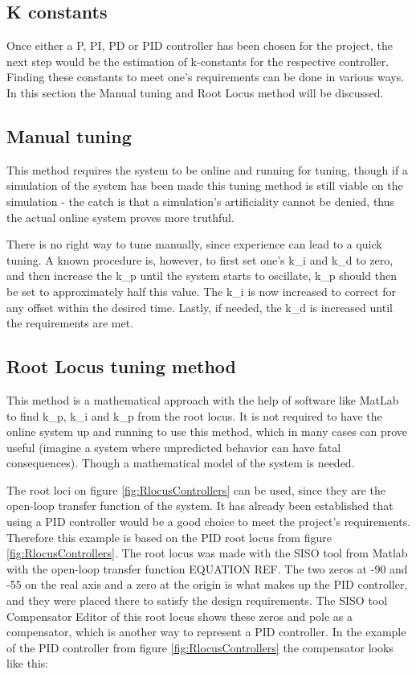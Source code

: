 \subsection{K constants}

Once either a P, PI, PD or PID controller has been chosen for the project, the next step would be the estimation of k-constants for the respective controller. Finding these constants to meet one's requirements can be done in various ways. In this section the Manual tuning and Root Locus method will be discussed.


\subsection{Manual tuning}

This method requires the system to be online and running for tuning, though if a simulation of the system has been made this tuning method is still viable on the simulation - the catch is that a simulation’s artificiality cannot be denied, thus the actual online system proves more truthful.\par

There is no right way to tune manually, since experience can lead to a quick tuning. A known procedure is, however, to first set one’s k\_i and k\_d to zero, and then increase the k\_p until the system starts to oscillate, k\_p should then be set to approximately half this value. The k\_i is now increased to correct for any offset within the desired time. Lastly, if needed, the k\_d is increased until the requirements are met.


\subsection{Root Locus tuning method}

This method is a mathematical approach with the help of software like MatLab to find k\_p, k\_i and k\_p from the root locus. It is not required to have the online system up and running to use this method, which in many cases can prove useful (imagine a system where unpredicted behavior can have fatal consequences). Though a mathematical model of the system is needed.\par

The root loci on figure \ref{fig:RlocusControllers} can be used, since they are the open-loop transfer function of the system. It has already been established that using a PID controller would be a good choice to meet the project’s requirements. Therefore this example is based on the PID root locus from figure \ref{fig:RlocusControllers}. The root locus was made with the SISO tool from Matlab with the open-loop transfer function EQUATION REF. The two zeros at -90 and -55 on the real axis and a zero at the origin  is what makes up the PID controller, and they were placed there to satisfy the design requirements. The SISO tool Compensator Editor of this root locus shows these zeros and pole as a compensator, which is another way to represent a PID controller. In the example of the PID controller from figure \ref{fig:RlocusControllers}  the compensator looks like this:\\ 


